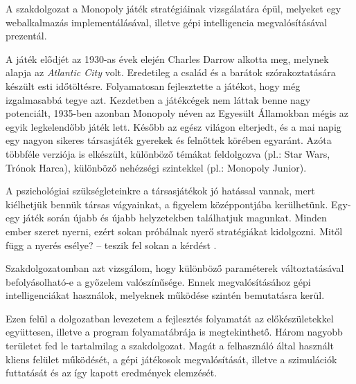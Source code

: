
A szakdolgozat a Monopoly játék stratégiáinak vizsgálatára épül, melyeket egy webalkalmazás implementálásával, illetve gépi intelligencia megvalósításával prezentál.

A játék elődjét az 1930-as évek elején Charles Darrow alkotta meg, melynek alapja az \textit{Atlantic City} volt. Eredetileg a család és a barátok szórakoztatására készült esti időtöltésre. Folyamatosan fejlesztette a játékot, hogy még izgalmasabbá tegye azt. Kezdetben a játékcégek nem láttak benne nagy potenciált, 1935-ben azonban Monopoly néven az Egyesült Államokban mégis az egyik legkelendőbb játék lett. Később az egész világon elterjedt, és a mai napig egy nagyon sikeres társasjáték gyerekek és felnőttek körében egyaránt. Azóta többféle verziója is elkészült, különböző témákat feldolgozva (pl.: Star Wars, Trónok Harca), különböző nehézségi szintekkel (pl.: Monopoly Junior).

A pszichológiai szükségleteinkre a társasjátékok jó hatással vannak, mert kiélhetjük bennük társas vágyainkat, a figyelem középpontjába kerülhetünk. Egy-egy játék során újabb és újabb helyzetekben találhatjuk magunkat. Minden ember szeret nyerni, ezért sokan próbálnak nyerő stratégiákat kidolgozni. Mitől függ a nyerés esélye? -- teszik fel sokan a kérdést \cite{shanklin2007using}.

Szakdolgozatomban azt vizsgálom, hogy különböző paraméterek változtatásával befolyásolható-e a győzelem valószínűsége. Ennek megvalósításához gépi intelligenciákat használok, melyeknek működése szintén bemutatásra kerül.

Ezen felül a dolgozatban levezetem a fejlesztés folyamatát az előkészületekkel együttesen, illetve a program folyamatábrája is megtekinthető. Három nagyobb területet fed le tartalmilag a szakdolgozat. Magát a felhasználó által használt kliens felület működését, a gépi játékosok megvalósítását, illetve a szimulációk futtatását és az így kapott eredmények elemzését.
